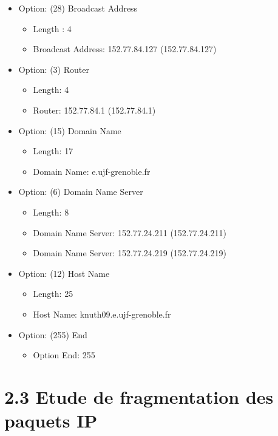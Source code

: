 \documentclass{article}
\begin{document}
\begin{itemize}
\begin{itemize}
	\end{itemize}
	\item  Option: (28) Broadcast Address
	\begin{itemize}
		\item Length : 4
		\item Broadcast Address: 152.77.84.127 (152.77.84.127)
	\end{itemize}
	\item  Option: (3) Router
	\begin{itemize}
		\item Length: 4
		\item Router: 152.77.84.1 (152.77.84.1)
	\end{itemize}
	\item  Option: (15) Domain Name
	\begin{itemize}
		\item Length: 17
		\item Domain Name: e.ujf-grenoble.fr
	\end{itemize}
	\item  Option: (6) Domain Name Server
	\begin{itemize}
		\item Length: 8
		\item Domain Name Server: 152.77.24.211 (152.77.24.211)
		\item Domain Name Server: 152.77.24.219 (152.77.24.219)
	\end{itemize}
	\item Option: (12) Host Name
	\begin{itemize}
		\item Length: 25
		\item Host Name: knuth09.e.ujf-grenoble.fr
	\end{itemize}
	\item Option: (255) End
	\begin{itemize}
		\item Option End: 255
	\end{itemize}
	

\end{itemize}

\section*{2.3 Etude de fragmentation des paquets IP}
\end{document}
